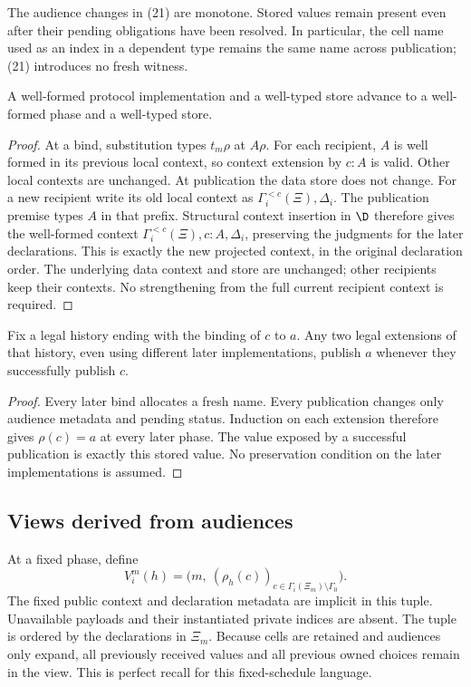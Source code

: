 The audience changes in (21) are monotone. Stored values remain present
even after their pending obligations have been resolved. In particular,
the cell name used as an index in a dependent type remains the same name
across publication; (21) introduces no fresh witness.

\begin{lemma}
\label{lem:phase-preservation}
A well-formed protocol implementation and a well-typed store advance to a
well-formed phase and a well-typed store.
\end{lemma}
\begin{proof}
At a bind, substitution types $t_m\rho$ at $A\rho$.
For each recipient, $A$ is well formed in its previous local context, so
context extension by $c:A$ is valid. Other local contexts are unchanged.
At publication the data store does not change. For a new recipient write
its old local context as $\Gamma_i^{<c}(\Xi),\Delta_i$.
The publication premise types $A$ in that prefix. Structural context
insertion in $\D$ therefore gives the well-formed context
$\Gamma_i^{<c}(\Xi),c:A,\Delta_i$, preserving the judgments for the
later declarations. This is exactly the new projected context, in the
original declaration order. The underlying data context and store are
unchanged; other recipients keep their contexts. No strengthening from
the full current recipient context is required.
\end{proof}

\begin{lemma}
\label{prop:binding}
Fix a legal history ending with the binding of $c$ to $a$. Any two legal
extensions of that history, even using different later implementations,
publish $a$ whenever they successfully publish $c$.
\end{lemma}
\begin{proof}
Every later bind allocates a fresh name. Every publication changes only
audience metadata and pending status. Induction on each extension therefore
gives $\rho(c)=a$ at every later phase. The value exposed by a successful
publication is exactly this stored value. No preservation condition on the
later implementations is assumed.
\end{proof}

\subsection{Views derived from audiences}

At a fixed phase, define
\[
 V_i^m(h)=\bigl(m,\ (\rho_h(c))_{c\in\Gamma_i(\Xi_m)\setminus\Gamma_0}\bigr).
 \tag{22}
\]
The fixed public context and declaration metadata are implicit in this
tuple. Unavailable payloads and their instantiated private indices are
absent. The tuple is ordered by the declarations in $\Xi_m$.
Because cells are retained and audiences only expand, all previously
received values and all previous owned choices remain in the view.
This is perfect recall for this fixed-schedule language.

